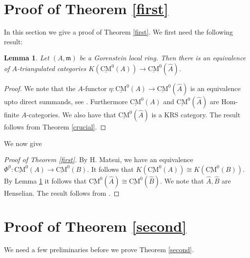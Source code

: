 \documentclass{amsart}
\newcommand{\m}{\mathfrak{m} }
\newcommand{\rt}{\rightarrow}
\newcommand{\wh}{\widehat }
\newcommand{\CMS}{\operatorname{\underline{CM}}}
\theoremstyle{plain}
\newtheorem{lemma}[theorem]{Lemma}
\theoremstyle{definition}
\theoremstyle{remark}
\begin{document}
{\section{Proof of Theorem \ref{first}}
In this section we give a proof of Theorem \ref{first}. We first need
the following result:
\begin{lemma}
\label{A-K} Let $(A,\m)$ be a Gorenstein local ring. Then there is an equivalence of $A$-triangulated categories $K(\CMS^0(A)) \rt \CMS^0(\wh{A})$.
\end{lemma}
\begin{proof}
  We note that the $A$-functor $\eta \colon \CMS^0(A) \rt \CMS^0(\wh{A})$ is an equivalence upto direct summands, see \cite[3.2]{T}. Furthermore $\CMS^0(A)$ and $\CMS^0(\wh{A})$ are Hom-finite $A$-categories. We also have that $\CMS^0(\wh{A})$ is a KRS category. The result follows from Theorem \ref{crucial}.
\end{proof}
We now give
\begin{proof}[Proof of Theorem \ref{first}]
By H. Matsui, \cite[4.6]{MH} we have an equivalence \\ $\Phi^0 \colon \CMS^0(A) \rt \CMS^0(B)$. It follows that $K(\CMS^0(A)) \cong K(\CMS^0(B))$. By Lemma \ref{A-K} it follows that $\CMS^0(\wh{A}) \cong \CMS^0(\wh{B})$. We note that $\wh{A}, \wh{B}$ are Henselian. The result follows from  \cite[6.12]{P-stable}.
\end{proof}

\section{Proof of Theorem \ref{second}}
We need a few preliminaries before we  prove Theorem \ref{second}.

}
\end{document}
